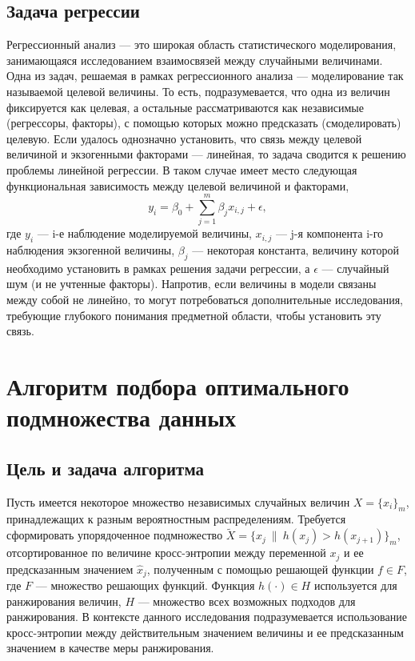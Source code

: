 \documentclass[runningheads]{llncs}
\begin{document}
\subsection{Задача регрессии}
Регрессионный анализ — это широкая область статистического моделирования, занимающаяся исследованием взаимосвязей между случайными величинами. Одна из задач, решаемая в рамках регрессионного анализа — моделирование так называемой целевой величины. То есть, подразумевается, что одна из величин фиксируется как целевая, а остальные рассматриваются как независимые (регрессоры, факторы), с помощью которых можно предсказать (смоделировать) целевую. Если удалось однозначно установить, что связь между целевой величиной и экзогенными факторами — линейная, то задача сводится к решению проблемы линейной регрессии. В таком случае имеет место следующая функциональная зависимость между целевой величиной и факторами,
$$y_i = \beta_0 + \sum_{j=1}^m \beta_j x_{i, j} + \epsilon,$$
где $y_i$ — i-е наблюдение моделируемой величины, $x_{i, j}$ — j-я компонента i-го наблюдения экзогенной величины, $\beta_j$ — некоторая константа, величину которой необходимо установить в рамках решения задачи регрессии, а $\epsilon$ — случайный шум (и не учтенные факторы). Напротив, если величины в модели связаны между собой не линейно, то могут потребоваться дополнительные исследования, требующие глубокого понимания предметной области, чтобы установить эту связь.

\section*{Алгоритм подбора оптимального подмножества данных}
\hspace{0.4cm}
\subsection{Цель и задача алгоритма}
Пусть имеется некоторое множество независимых случайных величин $X = \{x_i\}_m$, принадлежащих к разным вероятностным распределениям. Требуется сформировать упорядоченное подмножество $\tilde{X} = \{x_j\ \|\ h(x_{j}) > h(x_{j+1})\}_m$, отсортированное по величине кросс-энтропии между переменной $x_j$ и ее предсказанным значением $\hat{x}_j$, полученным с помощью решающей функции $f \in F$, где $F$ — множество решающих функций. Функция $h(\cdot) \in H$ используется для ранжирования величин, $H$ — множество всех возможных подходов для ранжирования. В контексте данного исследования подразумевается использование кросс-энтропии между действительным значением величины и ее предсказанным значением в качестве меры ранжирования.
\end{document}
